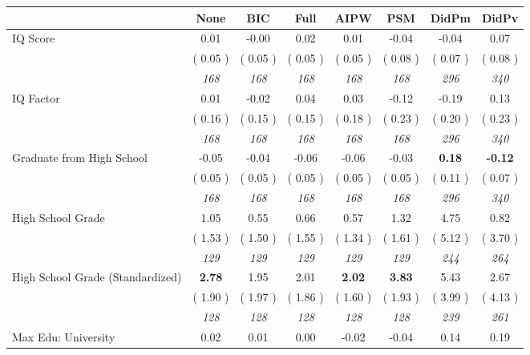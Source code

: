 \begin{tabular}{l c c c c c c c}
\toprule
 & None & BIC & Full & AIPW & PSM & DidPm & DidPv \\
\midrule
IQ Score &      0.01 &     -0.00 &      0.02 &      0.01 &     -0.04 &     -0.04 &      0.07 \\
& (     0.05 ) & (     0.05 ) & (     0.05 ) & (     0.05 ) & (     0.08 ) & (     0.07 ) & (     0.08 ) \\
& \textit{ 168 } & \textit{ 168 } & \textit{ 168 } & \textit{ 168 } & \textit{ 168 } & \textit{ 296 } & \textit{ 340 } \\
IQ Factor &      0.01 &     -0.02 &      0.04 &      0.03 &     -0.12 &     -0.19 &      0.13 \\
& (     0.16 ) & (     0.15 ) & (     0.15 ) & (     0.18 ) & (     0.23 ) & (     0.20 ) & (     0.23 ) \\
& \textit{ 168 } & \textit{ 168 } & \textit{ 168 } & \textit{ 168 } & \textit{ 168 } & \textit{ 296 } & \textit{ 340 } \\
Graduate from High School &     -0.05 &     -0.04 &     -0.06 &     -0.06 &     -0.03 & \textbf{      0.18 } & \textbf{     -0.12 } \\
& (     0.05 ) & (     0.05 ) & (     0.05 ) & (     0.05 ) & (     0.05 ) & (     0.11 ) & (     0.07 ) \\
& \textit{ 168 } & \textit{ 168 } & \textit{ 168 } & \textit{ 168 } & \textit{ 168 } & \textit{ 296 } & \textit{ 340 } \\
High School Grade &      1.05 &      0.55 &      0.66 &      0.57 &      1.32 &      4.75 &      0.82 \\
& (     1.53 ) & (     1.50 ) & (     1.55 ) & (     1.34 ) & (     1.61 ) & (     5.12 ) & (     3.70 ) \\
& \textit{ 129 } & \textit{ 129 } & \textit{ 129 } & \textit{ 129 } & \textit{ 129 } & \textit{ 244 } & \textit{ 264 } \\
High School Grade (Standardized) & \textbf{      2.78 } &      1.95 &      2.01 & \textbf{     2.02} & \textbf{     3.83} &      5.43 &      2.67 \\
& (     1.90 ) & (     1.97 ) & (     1.86 ) & (     1.60 ) & (     1.93 ) & (     3.99 ) & (     4.13 ) \\
& \textit{ 128 } & \textit{ 128 } & \textit{ 128 } & \textit{ 128 } & \textit{ 128 } & \textit{ 239 } & \textit{ 261 } \\
Max Edu: University &      0.02 &      0.01 &      0.00 &     -0.02 &     -0.04 &      0.14 &      0.19 \\

\end{tabular}

